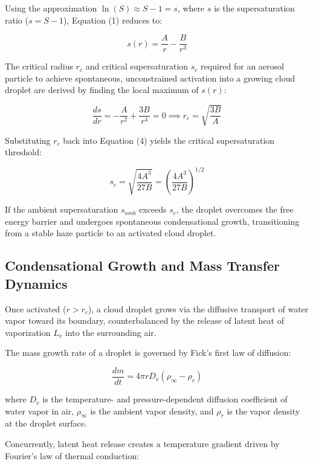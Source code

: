 \documentclass[12pt]{article}
\begin{document}
Using the approximation $\ln(S) \approx S - 1 = s$, where $s$ is the supersaturation ratio ($s = S - 1$), Equation (1) reduces to:

\begin{equation}
s(r) = \frac{A}{r} - \frac{B}{r^3}
\end{equation}

The critical radius $r_c$ and critical supersaturation $s_c$ required for an aerosol particle to achieve spontaneous, unconstrained activation into a growing cloud droplet are derived by finding the local maximum of $s(r)$:

\begin{equation}
\frac{ds}{dr} = -\frac{A}{r^2} + \frac{3B}{r^4} = 0 \implies r_c = \sqrt{\frac{3B}{A}}
\end{equation}

Substituting $r_c$ back into Equation (4) yields the critical supersaturation threshold:

\begin{equation}
s_c = \sqrt{\frac{4A^3}{27B}} = \left( \frac{4A^3}{27B} \right)^{1/2}
\end{equation}

If the ambient supersaturation $s_{amb}$ exceeds $s_c$, the droplet overcomes the free energy barrier and undergoes spontaneous condensational growth, transitioning from a stable haze particle to an activated cloud droplet.

\subsection{Condensational Growth and Mass Transfer Dynamics}
Once activated ($r > r_c$), a cloud droplet grows via the diffusive transport of water vapor toward its boundary, counterbalanced by the release of latent heat of vaporization $L_v$ into the surrounding air.

The mass growth rate of a droplet is governed by Fick's first law of diffusion:

\begin{equation}
\frac{dm}{dt} = 4 \pi r D_v (\rho_{\infty} - \rho_r)
\end{equation}

where $D_v$ is the temperature- and pressure-dependent diffusion coefficient of water vapor in air, $\rho_{\infty}$ is the ambient vapor density, and $\rho_r$ is the vapor density at the droplet surface.

Concurrently, latent heat release creates a temperature gradient driven by Fourier's law of thermal conduction:
\end{document}
